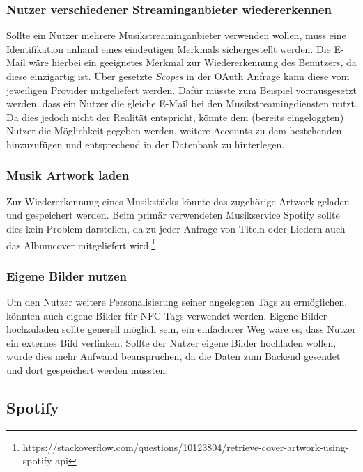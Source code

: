 \documentclass[10pt, a4paper]{article}
\begin{document}
\begin{onehalfspace}
\subsubsection*{Nutzer verschiedener Streaminganbieter wiedererkennen}
Sollte ein Nutzer mehrere Musikstreaminganbieter verwenden wollen, muss eine Identifikation anhand eines eindeutigen Merkmals sichergestellt werden.
Die E-Mail wäre hierbei ein geeignetes Merkmal zur Wiedererkennung des Benutzers, da diese einzigartig ist.
Über gesetzte \textit{Scopes} in der OAuth Anfrage kann diese vom jeweiligen Provider mitgeliefert werden.
Dafür müsste zum Beispiel vorrausgesetzt werden, dass ein Nutzer die gleiche E-Mail bei den Musikstreamingdiensten nutzt.
Da dies jedoch nicht der Realität entspricht, könnte dem (bereits eingeloggten) Nutzer die Möglichkeit gegeben werden, weitere Accounts zu dem bestehenden hinzuzufügen und entsprechend in der Datenbank zu hinterlegen.

\subsubsection*{Musik Artwork laden}
Zur Wiedererkennung eines Musikstücks könnte das zugehörige Artwork geladen und gespeichert werden.
Beim primär verwendeten Musikservice Spotify sollte dies kein Problem darstellen, da zu jeder Anfrage von Titeln oder Liedern auch das Albumcover mitgeliefert wird.\footnote{https://stackoverflow.com/questions/10123804/retrieve-cover-artwork-using-spotify-api}

\subsubsection*{Eigene Bilder nutzen}
Um den Nutzer weitere Personalisierung seiner angelegten Tags zu ermöglichen, könnten auch eigene Bilder für NFC-Tags verwendet werden.
Eigene Bilder hochzuladen sollte generell möglich sein, ein einfacherer Weg wäre es, dass Nutzer ein externes Bild verlinken.
Sollte der Nutzer eigene Bilder hochladen wollen, würde dies mehr Aufwand beanspruchen, da die Daten zum Backend gesendet und dort gespeichert werden müssten.

\subsection{Spotify}

\end{onehalfspace}
\end{document}
